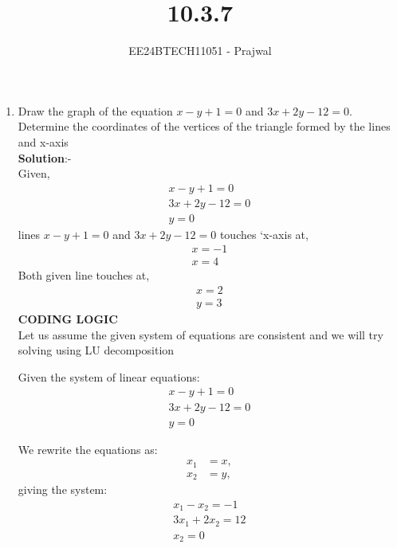 \documentclass[journal]{IEEEtran}
\numberwithin{equation}{enumi}
\numberwithin{figure}{enumi}
\begin{document}

\title{10.3.7}
\author{EE24BTECH11051 - Prajwal}
{\let\newpage\relax\maketitle}
\begin{enumerate}
\item Draw the graph of the equation $x-y+1=0$ and $3x+2y-12=0$. Determine the coordinates of the vertices of the triangle formed by the lines and x-axis\\
\textbf{Solution}:-\\
Given,
\begin{align}
x-y+1=0\\
3x+2y-12=0\\
y=0
\end{align}
lines $x-y+1=0$ and $3x+2y-12=0$ touches `x-axis at,
\begin{align}
    x=-1\\
    x=4
\end{align}
Both given line touches at,
\begin{align}
    x=2\\
    y=3
\end{align}
\textbf{CODING LOGIC}\\


	Let us assume the given system of equations are consistent and we will try solving using LU decomposition
	
	Given the system of linear equations:
	\begin{align}
	x-y+1=0\\
    3x+2y-12=0\\
    y=0
	\end{align}
	
	We rewrite the equations as:
	\begin{align}
		x_1 &= x, \\
        		x_2 &= y,
	\end{align}
	giving the system:
	\begin{align}
	x_1-x_2=-1\\
    3x_1+2x_2=12\\
    x_2=0
	\end{align}
	

\end{enumerate}
\end{document}
